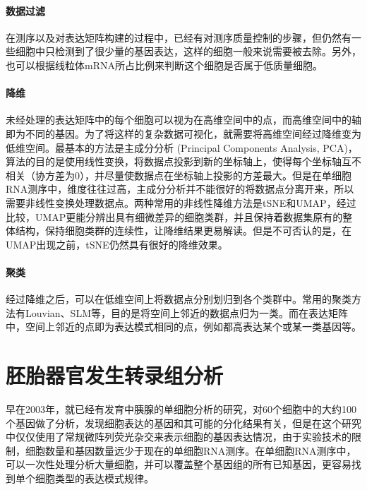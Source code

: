 \documentclass[lang=cn]{elegantpaper}
\begin{document}
\paragraph{数据过滤}
在测序以及对表达矩阵构建的过程中，已经有对测序质量控制的步骤，但仍然有一些细胞中只检测到了很少量的基因表达，这样的细胞一般来说需要被去除。另外，也可以根据线粒体mRNA所占比例来判断这个细胞是否属于低质量细胞。

\paragraph{降维}
未经处理的表达矩阵中的每个细胞可以视为在高维空间中的点，而高维空间中的轴即为不同的基因。为了将这样的复杂数据可视化，就需要将高维空间经过降维变为低维空间。最基本的方法是主成分分析 (Principal Components Analysis, PCA)，算法的目的是使用线性变换，将数据点投影到新的坐标轴上，使得每个坐标轴互不相关（协方差为0），并尽量使数据点在坐标轴上投影的方差最大\citep{pearson_liii._1901}。但是在单细胞RNA测序中，维度往往过高，主成分分析并不能很好的将数据点分离开来，所以需要非线性变换处理数据点\citep{becht_dimensionality_2019}。两种常用的非线性降维方法是tSNE\citep{maaten_visualizing_2008}和UMAP\citep{mcinnes_umap:_2018}，经过比较，UMAP更能分辨出具有细微差异的细胞类群，并且保持着数据集原有的整体结构，保持细胞类群的连续性，让降维结果更易解读\citep{becht_dimensionality_2019}。但是不可否认的是，在UMAP出现之前，tSNE仍然具有很好的降维效果。

\paragraph{聚类}
经过降维之后，可以在低维空间上将数据点分别划归到各个类群中。常用的聚类方法有Louvian\citep{blondel_fast_2008}、SLM\citep{traag_louvain_2018}等，目的是将空间上邻近的数据点归为一类。而在表达矩阵中，空间上邻近的点即为表达模式相同的点，例如都高表达某个或某一类基因等。

\section{胚胎器官发生转录组分析}
早在2003年，就已经有发育中胰腺的单细胞分析的研究，对60个细胞中的大约100个基因做了分析，发现细胞表达的基因和其可能的分化结果有关\citep{chiang_single-cell_2003}，但是在这个研究中仅仅使用了常规微阵列荧光杂交来表示细胞的基因表达情况，由于实验技术的限制，细胞数量和基因数量远少于现在的单细胞RNA测序。在单细胞RNA测序中，可以一次性处理分析大量细胞，并可以覆盖整个基因组的所有已知基因，更容易找到单个细胞类型的表达模式规律\citep{hedlund_single-cell_2018}。
\end{document}
